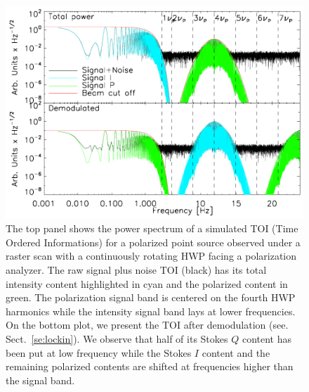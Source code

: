 \documentclass[twocolumn, traditabstract]{aa}
\begin{document}
\begin{figure}
\includegraphics[width=1.\linewidth,keepaspectratio]{toi_simu.pdf}
\caption{The top panel shows the power spectrum of a simulated 
  TOI (Time Ordered Informations) for a polarized point source observed under a
  raster scan with a continuously rotating HWP facing
  a polarization analyzer. The raw signal plus noise TOI (black) has its total
  intensity content highlighted in cyan and the polarized content in green. The
  polarization signal band is centered on the fourth HWP harmonics while the
  intensity signal band lays at lower frequencies. On the bottom plot, we
  present the TOI after demodulation (see. Sect.~\ref{se:lockin}). We observe
  that half of its Stokes $Q$ content has been put at low frequency while the
  Stokes $I$ content and the remaining polarized contents are shifted at
  frequencies higher than the signal band.}
   \label{fig:toi_simu}
\end{figure}  
\end{document}

